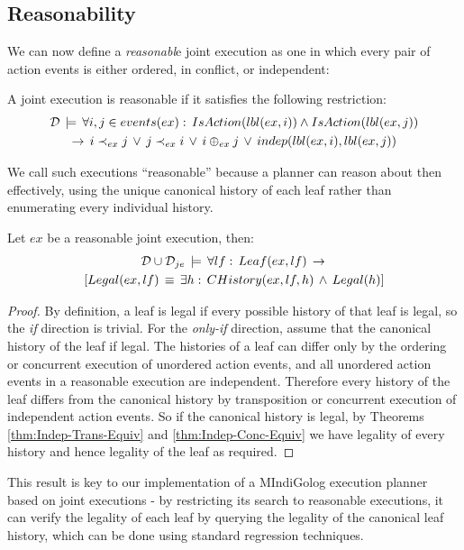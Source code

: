 \subsection{Reasonability}

We can now define a \emph{reasonabl}e joint execution as one in which
every pair of action events is either ordered, in conflict, or independent:

\begin{defnL}
 A joint execution is reasonable
if it satisfies the following restriction:\begin{multline*}
\mathcal{D}\,\models\,\forall i,j\in events(ex):\, IsAction(lbl(ex,i))\wedge IsAction(lbl(ex,j))\\
\rightarrow\, i\prec_{ex}j\,\vee\, j\prec_{ex}i\,\vee\, i\oplus_{ex}j\,\vee\, indep(lbl(ex,i),lbl(ex,j))\end{multline*}

\end{defnL}
We call such executions {}``reasonable'' because a planner can reason
about then effectively, using the unique canonical history of each
leaf rather than enumerating every individual history.

\begin{thm}
Let $ex$ be a reasonable joint execution, then:\begin{multline*}
\mathcal{D}\cup\mathcal{D}_{je}\,\models\,\forall lf:\, Leaf(ex,lf)\,\rightarrow\,\\
\left[Legal(ex,lf)\,\equiv\,\exists h:\, CHistory(ex,lf,h)\,\wedge\, Legal(h)\right]\end{multline*}

\end{thm}
\begin{proof}
By definition, a leaf is legal if every possible history of that leaf
is legal, so the \emph{if} direction is trivial. For the \emph{only-if}
direction, assume that the canonical history of the leaf if legal.
The histories of a leaf can differ only by the ordering or concurrent
execution of unordered action events, and all unordered action events
in a reasonable execution are independent. Therefore every history
of the leaf differs from the canonical history by transposition or
concurrent execution of independent action events. So if the canonical
history is legal, by Theorems \ref{thm:Indep-Trans-Equiv} and \ref{thm:Indep-Conc-Equiv}
we have legality of every history and hence legality of the leaf as
required. 
\end{proof}
This result is key to our implementation of a MIndiGolog execution
planner based on joint executions - by restricting its search to reasonable
executions, it can verify the legality of each leaf by querying the
legality of the canonical leaf history, which can be done using standard
regression techniques.

